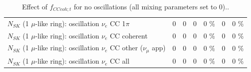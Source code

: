 \begin{table}
\begin{tabular}{| l | r | r | r  r | r  r |}
                     $N_{SK}$ (1 $\mu$-like ring): oscillation $\nu_e$ CC 1$\pi$ &               0 &               0 &               0 &        0 \%  &               0 &        0 \%  \\ 
                   $N_{SK}$ (1 $\mu$-like ring): oscillation $\nu_e$ CC coherent &               0 &               0 &               0 &        0 \%  &               0 &        0 \%  \\ 
      $N_{SK}$ (1 $\mu$-like ring): oscillation $\nu_e$ CC other ($\nu_\mu$ app) &               0 &               0 &               0 &        0 \%  &               0 &        0 \%  \\ 
                       $N_{SK}$ (1 $\mu$-like ring): oscillation $\nu_e$  CC all &               0 &               0 &               0 &        0 \%  &               0 &        0 \%  \\ 
\hline
\hline
\end{tabular}
\caption{ Effect of $f_{CCcoh; t}$ for no oscillations (all mixing parameters set to 0).. }
\label{tab:num_xsec_norm_cccoh_1RmuT_3f_osc_t13:0}
\end{table}
\clearpage
